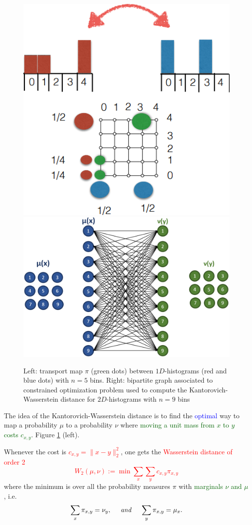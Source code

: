 \documentclass[al, 27pt, plainboxedsections, landscape]{sciposter}
\newcommand{\tb}[1]{\textcolor{blue}{#1}}
\newcommand{\tre}[1]{\textcolor{red}{#1}}
\newcommand{\tgr}[1]{\textcolor{darkgreen}{#1}}
\begin{document}
\begin{multicols}{3}
 \begin{figure}
     \centering
     {\includegraphics[width=0.35\columnwidth]{images/intro_disc}\label{<figure1>}}
	 \hspace{0.09\columnwidth}
     {\includegraphics[width=0.5\columnwidth]{images/fig3}\label{<figure2>}}
     \caption{Left: transport map $\pi$  (green dots) between $1D $-histograms (red and blue dots) with $n=5$ bins. 
     Right:
     bipartite graph associated to  constrained optimization problem used to compute the
     Kantorovich-Wasserstein distance for $2D $-histograms with $n=9$ bins}
     \label{steady_state}
\end{figure}



The idea of 
the Kantorovich-Wasserstein distance is to find 
 the \tb{optimal} way to map a probability $\mu$ to a probability $\nu$ where   \tgr{moving a unit mass from $x$ to $y$ costs $c_{x,y}$}.
 Figure \ref{steady_state} (left).
 
	
Whenever the cost  is \tre{$c_{x,y}=\|x-y\|_2^2$}, %
one gets the \tre{Wasserstein distance of order 2}
\tre{
\[
W_2(\mu,\nu) := \min \sum_{x}\sum_{y}c_{x,y} \pi_{x,y}
\]}
where the minimum is over all the probability measures $\pi$ with \tgr{marginals $\nu$ and $\mu$},  i.e. 
\[
\sum_{x}\pi_{x,y}=\nu_y, \;\;\;\;\; \emph{and}  \;\;\;\;\; \sum_{y}\pi_{x,y}= \mu_x.
\]




\end{multicols}
\end{document}
